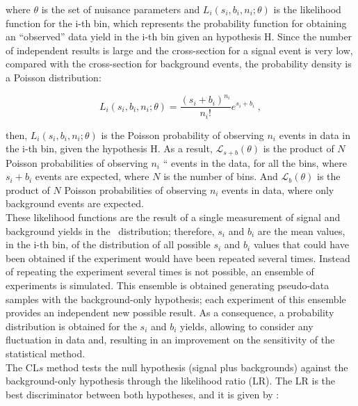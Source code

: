 \noindent where $\theta$ is the set of nuisance parameters 
and $L_{i}(s_{i},b_{i},n_{i};\theta)$ is the likelihood function for the i-th bin, 
which represents the probability function for obtaining an ``observed'' data yield in 
the i-th bin given an hypothesis H. Since the 
number of independent results is large and the cross-section for a 
signal event is very low, compared with the cross-section for background 
events, the probability density is a Poisson distribution:

\begin{equation} \label{eq:Poisson}
 L_{i}(s_{i},b_{i},n_{i};\theta) = \frac{(s_{i}+b_{i})^{n_{i}}}{n_{i}!}e^{s_{i}+b_{i}} \; ,
\end{equation}

\noindent then, $L_{i}(s_{i},b_{i},n_{i};\theta)$ is the Poisson probability of observing
$n_{i}$ events in data in the i-th bin, given the hypothesis H. As a result, $\mathcal{L}_{s+b}(\theta)$ is 
the product of $N$ Poisson probabilities of observing ${n_{i}}$ `` events in the data, for all 
the bins, where ${s_{i}+b_{i}}$ events are expected, where $N$ is the number of bins. And $\mathcal{L}_{b}(\theta)$ is the product 
of $N$ Poisson probabilities of observing ${n_{i}}$ events in data, where only background 
events are expected.\\

\noindent These likelihood functions are the result of a 
single measurement of signal and background yields 
in the \mass~distribution; therefore, $s_{i}$ and $b_{i}$ are the mean values, 
in the i-th bin, of the distribution of all possible $s_{i}$ and $b_{i}$ values that 
could have been obtained if the experiment would have been repeated several times. Instead 
of repeating the experiment several times is not possible, an 
ensemble of experiments is simulated. This ensemble is obtained generating 
pseudo-data samples with the background-only hypothesis; each experiment of this ensemble
provides an independent new possible result. As a consequence, a probability 
distribution is obtained for the $s_{i}$ and $b_{i}$ yields, allowing to consider 
any fluctuation in data and, resulting in an improvement on 
the sensitivity of the statistical method. \\

\noindent The CL${s}$ method tests the null hypothesis 
(signal plus backgrounds) against the background-only hypothesis through 
the likelihood ratio (LR). The LR is the best discriminator between both hypotheses,
and it is given by \cite{CLs1Cowan}:

